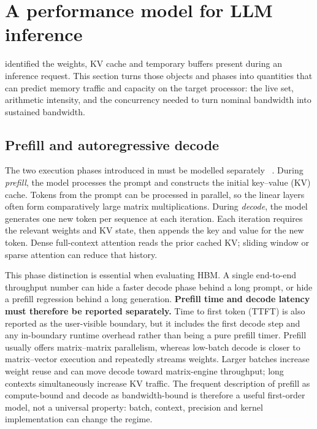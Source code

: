 
\section{A performance model for LLM inference}
\label{sec:inference-model}

 identified the weights, KV cache
and temporary buffers present during an inference request.  This section
turns those objects and phases into quantities that can predict memory
traffic and capacity on the target processor: the live set, arithmetic
intensity, and the concurrency needed to turn nominal bandwidth into
sustained bandwidth.

\subsection{Prefill and autoregressive decode}

The two execution phases introduced in
 must be modelled separately
~\cite{na2024llmcpu}.  During
\emph{prefill}, the model processes the prompt and constructs the
initial key--value (KV) cache.  Tokens from the prompt can be processed
in parallel, so the linear layers often form comparatively large matrix
multiplications.  During \emph{decode}, the model generates one new
token per sequence at each iteration.  Each iteration requires the
relevant weights and KV state, then appends the key and value for the new
token.  Dense full-context attention reads the prior cached KV; sliding
window or sparse attention can reduce that history.

This phase distinction is essential when evaluating HBM.  A single
end-to-end throughput number can hide a faster decode phase behind a
long prompt, or hide a prefill regression behind a long generation.
\textbf{Prefill time and decode latency must therefore be reported
separately.}  Time to first token (TTFT) is also reported as the
user-visible boundary, but it includes the first decode step and any
in-boundary runtime overhead rather than being a pure prefill timer.  Prefill
usually offers matrix--matrix parallelism, whereas low-batch decode is
closer to matrix--vector execution and repeatedly streams weights.
Larger batches increase weight reuse and can move decode toward
matrix-engine throughput; long contexts simultaneously increase KV
traffic.  The frequent description of prefill as compute-bound and decode as
bandwidth-bound is therefore a useful first-order model, not a universal
property: batch, context, precision and kernel implementation can change the
regime.


